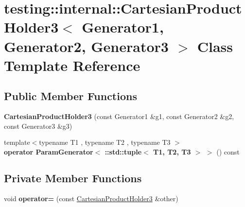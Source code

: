 \hypertarget{classtesting_1_1internal_1_1_cartesian_product_holder3}{}\section{testing\+:\+:internal\+:\+:Cartesian\+Product\+Holder3$<$ Generator1, Generator2, Generator3 $>$ Class Template Reference}
\label{classtesting_1_1internal_1_1_cartesian_product_holder3}
\subsection*{Public Member Functions}
\begin{DoxyCompactItemize}
\item 
\mbox{\label{classtesting_1_1internal_1_1_cartesian_product_holder3_ad74b6d31441c7f3f7f8514a563c8277e}} 
{\bfseries Cartesian\+Product\+Holder3} (const Generator1 \&g1, const Generator2 \&g2, const Generator3 \&g3)
\item 
\mbox{\label{classtesting_1_1internal_1_1_cartesian_product_holder3_a10074f00be0b5069dbc67ef5c66fbf0c}} 
{\footnotesize template$<$typename T1 , typename T2 , typename T3 $>$ }\\{\bfseries operator Param\+Generator$<$ \+::std\+::tuple$<$ T1, T2, T3 $>$ $>$} () const
\end{DoxyCompactItemize}
\subsection*{Private Member Functions}
\begin{DoxyCompactItemize}
\item 
\mbox{\label{classtesting_1_1internal_1_1_cartesian_product_holder3_a562b9057c3ae909c260de1ee62960ac6}} 
void {\bfseries operator=} (const \mbox{\hyperlink{classtesting_1_1internal_1_1_cartesian_product_holder3}{Cartesian\+Product\+Holder3}} \&other)
\end{DoxyCompactItemize}
